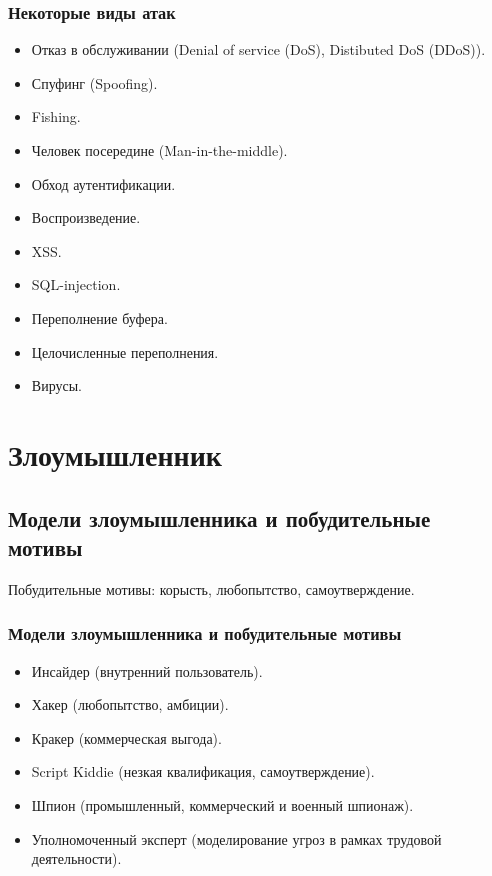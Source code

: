 \begin{frame}
    \frametitle{Некоторые виды атак}
    
    \begin{itemize}
        \item Отказ в обслуживании (Denial of service (DoS), Distibuted DoS (DDoS)).
        \item Спуфинг (Spoofing).
        \item Fishing.
        \item Человек посередине (Man-in-the-middle).
        \item Обход аутентификации.
        \item Воспроизведение.
        \item XSS.
        \item SQL-injection.
        \item Переполнение буфера.
        \item Целочисленные переполнения.
        \item Вирусы.
    \end{itemize}
\end{frame}


\section{Злоумышленник}


\subsection{Модели злоумышленника и побудительные мотивы}

Побудительные мотивы: корысть, любопытство, самоутверждение.

\begin{frame}
    \frametitle{Модели злоумышленника и побудительные мотивы}
    
    \begin{itemize}
        \item Инсайдер (внутренний пользователь).
        \item Хакер (любопытство, амбиции).
        \item Кракер (коммерческая выгода).
        \item Script Kiddie (незкая квалификация, самоутверждение).
        \item Шпион (промышленный, коммерческий и военный шпионаж).
        \item Уполномоченный эксперт (моделирование угроз в рамках трудовой деятельности).
    \end{itemize}
\end{frame}


